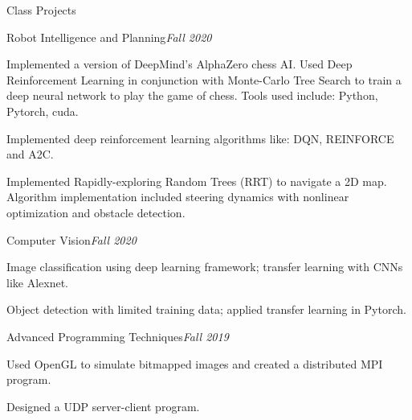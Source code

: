 \documentclass{resume} %
\begin{document}
\begin{rSection}{Class Projects}
\begin{rSubsection}{Robot Intelligence and Planning}{\em Fall 2020}{}{}
\item Implemented a version of DeepMind's AlphaZero chess AI. Used Deep Reinforcement Learning in conjunction with Monte-Carlo Tree Search to train a deep neural network to play the game of chess. Tools used include: Python, Pytorch, cuda.

\item Implemented deep reinforcement learning algorithms like: DQN, REINFORCE and A2C.

\item Implemented Rapidly-exploring Random Trees (RRT) to navigate a 2D map. Algorithm implementation included steering dynamics with nonlinear optimization and obstacle detection.

\end{rSubsection}
\begin{rSubsection}{Computer Vision}{\em Fall 2020}{}{}
\item Image classification using deep learning framework; transfer learning with CNNs like Alexnet.
\item Object detection with limited training data; applied transfer learning in Pytorch.
\end{rSubsection}
\begin{rSubsection}{Advanced Programming Techniques}{\em Fall 2019}{}{}
\item Used OpenGL to simulate bitmapped images and created a distributed MPI program. 
\item Designed a UDP server-client program.
\end{rSubsection}

\end{rSection}

\end{document}
